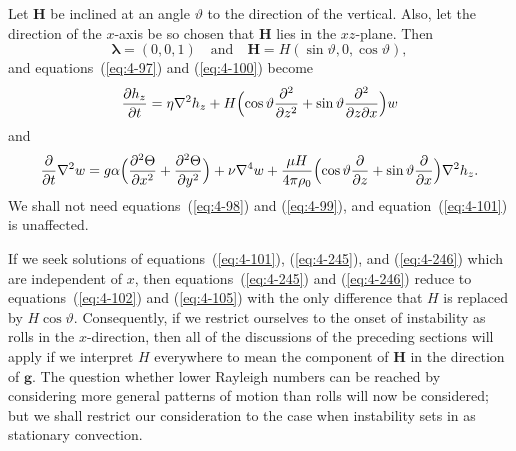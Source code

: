 Let $\mathbf{H}$ be inclined at an angle $\vartheta$ to the direction of the vertical. Also, let the direction of the $x$-axis be so chosen that $\mathbf{H}$ lies in the $xz$-plane. Then
\begin{equation}
\label{eq:4-244}
\boldsymbol{\lambda} = (0,0,1) \quad\text{and}\quad \mathbf{H} = H(\sin\vartheta, 0, \cos\vartheta),
\end{equation}
and equations~(\ref{eq:4-97}) and (\ref{eq:4-100}) become
\begin{equation}
\label{eq:4-245}
\frac{\partial h_z}{\partial t} = \eta\nabla^2 h_z + H\Bigl(\cos\vartheta\frac{\partial^2}{\partial z^2}+\sin\vartheta\frac{\partial^2}{\partial z\partial x}\Bigr)w
\end{equation}
and
\begin{equation}
\label{eq:4-246}
\frac{\partial}{\partial t}\nabla^2 w = g\alpha\Bigl(\frac{\partial^2\Theta}{\partial x^2}+\frac{\partial^2\Theta}{\partial y^2}\Bigr)+\nu\nabla^4 w + \frac{\mu H}{4\pi\rho_0}\Bigl(\cos\vartheta\frac{\partial}{\partial z}+\sin\vartheta\frac{\partial}{\partial x}\Bigr)\nabla^2 h_z.
\end{equation}
We shall not need equations~(\ref{eq:4-98}) and (\ref{eq:4-99}), and equation~(\ref{eq:4-101}) is unaffected.

If we seek solutions of equations~(\ref{eq:4-101}), (\ref{eq:4-245}), and (\ref{eq:4-246}) which are independent of $x$, then equations~(\ref{eq:4-245}) and (\ref{eq:4-246}) reduce to equations~(\ref{eq:4-102}) and (\ref{eq:4-105}) with the only difference that $H$ is replaced by $H\cos\vartheta$. Consequently, if we restrict ourselves to the onset of instability as rolls in the $x$-direction, then all of the discussions of the preceding sections will apply if we interpret $H$ everywhere to mean the component of $\mathbf{H}$ in the direction of $\mathbf{g}$. The question whether lower Rayleigh numbers can be reached by considering more general patterns of motion than rolls will now be considered; but we shall restrict our consideration to the case when instability sets in as stationary convection.

